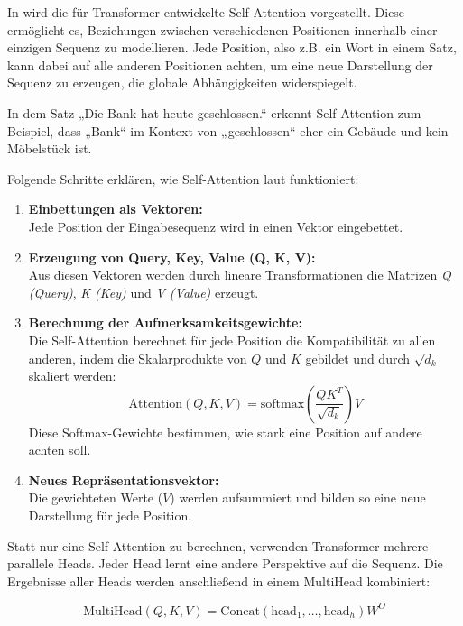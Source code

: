In \cite{vaswani2023attentionneed} wird die für Transformer entwickelte Self-Attention vorgestellt.
Diese ermöglicht es, Beziehungen zwischen verschiedenen Positionen innerhalb einer einzigen Sequenz zu modellieren. 
Jede Position, also z.B. ein Wort in einem Satz, kann dabei auf alle anderen Positionen achten, um eine neue Darstellung der Sequenz zu erzeugen, 
die globale Abhängigkeiten widerspiegelt.

In dem Satz „Die Bank hat heute geschlossen.“ erkennt Self-Attention zum Beispiel, dass „Bank“ im Kontext von „geschlossen“ eher ein Gebäude 
und kein Möbelstück ist.

Folgende Schritte erklären, wie Self-Attention laut \cite{vaswani2023attentionneed} funktioniert:

\begin{enumerate}
    \item \textbf{Einbettungen als Vektoren:} \\
    Jede Position der Eingabesequenz wird in einen Vektor eingebettet.

    \item \textbf{Erzeugung von Query, Key, Value (Q, K, V):} \\
    Aus diesen Vektoren werden durch lineare Transformationen die Matrizen \textit{Q (Query)}, \textit{K (Key)} und \textit{V (Value)} erzeugt.

    \item \textbf{Berechnung der Aufmerksamkeitsgewichte:} \\
    Die Self-Attention berechnet für jede Position die Kompatibilität zu allen anderen, indem die Skalarprodukte von $Q$ und $K$ gebildet und durch $\sqrt{d_k}$ skaliert werden:
    \[
    \text{Attention}(Q, K, V) = \text{softmax}\left(\frac{QK^T}{\sqrt{d_k}}\right) V
    \]
    Diese Softmax-Gewichte bestimmen, wie stark eine Position auf andere achten soll.

    \item \textbf{Neues Repräsentationsvektor:} \\
    Die gewichteten Werte ($V$) werden aufsummiert und bilden so eine neue Darstellung für jede Position. 
\end{enumerate}

Statt nur eine Self-Attention zu berechnen, verwenden Transformer mehrere parallele Heads. Jeder Head lernt eine andere Perspektive auf die Sequenz. 
Die Ergebnisse aller Heads werden anschließend in einem MultiHead kombiniert:

\begin{equation}
   \text{MultiHead}(Q, K, V) = \text{Concat}(\text{head}_1, \ldots, \text{head}_h) W^O 
\end{equation}


